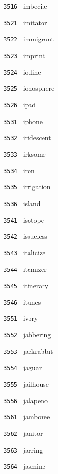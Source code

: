 \documentclass[11pt]{article}
\begin{document}
\begin{multicols}{6}
\noindent \texttt{ 3516 } imbecile  \par
\vspace{3mm}
\noindent \texttt{ 3521 } imitator  \par
\noindent \texttt{ 3522 } immigrant  \par
\noindent \texttt{ 3523 } imprint  \par
\noindent \texttt{ 3524 } iodine  \par
\noindent \texttt{ 3525 } ionosphere  \par
\noindent \texttt{ 3526 } ipad  \par
\vspace{3mm}
\noindent \texttt{ 3531 } iphone  \par
\noindent \texttt{ 3532 } iridescent  \par
\noindent \texttt{ 3533 } irksome  \par
\noindent \texttt{ 3534 } iron  \par
\noindent \texttt{ 3535 } irrigation  \par
\noindent \texttt{ 3536 } island  \par
\vspace{3mm}
\noindent \texttt{ 3541 } isotope  \par
\noindent \texttt{ 3542 } issueless  \par
\noindent \texttt{ 3543 } italicize  \par
\noindent \texttt{ 3544 } itemizer  \par
\noindent \texttt{ 3545 } itinerary  \par
\noindent \texttt{ 3546 } itunes  \par
\vspace{3mm}
\noindent \texttt{ 3551 } ivory  \par
\noindent \texttt{ 3552 } jabbering  \par
\noindent \texttt{ 3553 } jackrabbit  \par
\noindent \texttt{ 3554 } jaguar  \par
\noindent \texttt{ 3555 } jailhouse  \par
\noindent \texttt{ 3556 } jalapeno  \par
\vspace{3mm}
\noindent \texttt{ 3561 } jamboree  \par
\noindent \texttt{ 3562 } janitor  \par
\noindent \texttt{ 3563 } jarring  \par
\noindent \texttt{ 3564 } jasmine  \par

\end{multicols}
\end{document}
